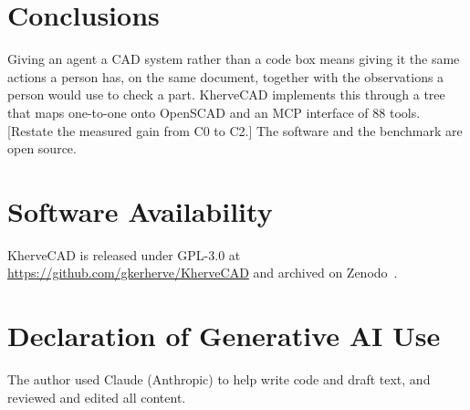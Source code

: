 \documentclass[lineno]{asmejour}
\begin{document}
\section{Conclusions}

Giving an agent a CAD system rather than a code box means giving it the same actions a person has, on the same document, together with the observations a person would use to check a part. KherveCAD implements this through a tree that maps one-to-one onto OpenSCAD and an MCP interface of 88 tools. [Restate the measured gain from C0 to C2.] The software and the benchmark are open source.

\section*{Software Availability}
KherveCAD is released under GPL-3.0 at \url{https://github.com/gkerherve/KherveCAD} and archived on Zenodo~\cite{kherveCADzenodo}.

\section*{Declaration of Generative AI Use}
The author used Claude (Anthropic) to help write code and draft text, and reviewed and edited all content.



\end{document}
